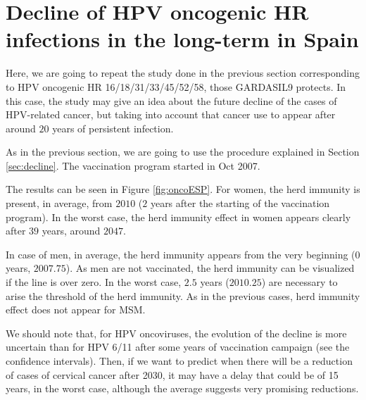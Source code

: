 \section{Decline of HPV oncogenic HR infections in the long-term in Spain}\label{sec:onco_spain}
Here, we are going to repeat the study done in the previous section corresponding to HPV oncogenic HR 16/18/31/33/45/52/58, those GARDASIL9 protects. In this case, the study may give an idea about the future decline of the cases of HPV-related cancer, but taking into account that cancer use to appear after around $20$ years of persistent infection. 

As in the previous section, we are going to use the procedure explained in Section \ref{sec:decline}. The vaccination program started in Oct 2007.

The results can be seen in Figure \ref{fig:oncoESP}. For women, the herd immunity is present, in average, from $2010$ ($2$ years after the starting of the vaccination program). In the worst case, the herd immunity effect in women appears clearly after $39$ years, around $2047$.

In case of men, in average, the herd immunity appears from the very beginning ($0$ years, $2007.75$). As men are not vaccinated, the herd immunity can be visualized if the line is over zero. In the worst case, $2.5$ years ($2010.25$) are necessary to arise the threshold of the herd immunity. As in the previous cases, herd immunity effect does not appear for MSM.

We should note that, for HPV oncoviruses, the evolution of the decline is more uncertain than for HPV 6/11 after some years of vaccination campaign (see the confidence intervals). Then, if we want to predict when there will be a reduction of cases of cervical cancer after 2030, it may have a delay that could be of 15 years, in the worst case, although the average suggests very promising reductions.

